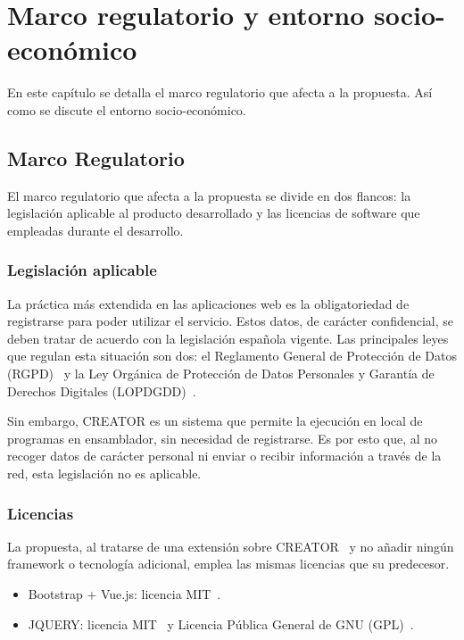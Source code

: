 \chapter{Marco regulatorio y entorno socio-económico}\label{chap:regulation}
En este capítulo se detalla el marco regulatorio que afecta a la propuesta. Así como se discute el entorno socio-económico.

\section{Marco Regulatorio}\label{sec:regulatory-framework}
El marco regulatorio que afecta a la propuesta se divide en dos flancos: la legislación aplicable al producto desarrollado y las licencias de software que empleadas durante el desarrollo.

\subsection{Legislación aplicable}
La práctica más extendida en las aplicaciones web es la obligatoriedad de registrarse para poder utilizar el servicio. Estos datos, de carácter confidencial, se deben tratar de acuerdo con la legislación española vigente. Las principales leyes que regulan esta situación son dos: el Reglamento General de Protección de Datos (RGPD)~\cite{rgpd} y la Ley Orgánica de Protección de Datos Personales y Garantía de Derechos Digitales (LOPDGDD)~\cite{ley-de-datos}.

Sin embargo, CREATOR es un sistema que permite la ejecución en local de programas en ensamblador, sin necesidad de registrarse. Es por esto que, al no recoger datos de carácter personal ni enviar o recibir información a través de la red, esta legislación no es aplicable.

\subsection{Licencias}
La propuesta, al tratarse de una extensión sobre CREATOR~\cite{camarmas2024creator} y no añadir ningún framework o tecnología adicional, emplea las mismas licencias que su predecesor.

\begin{itemize}
    \item Bootstrap + Vue.js: licencia MIT~\cite{MIT-license}.
    \item JQUERY: licencia MIT~\cite{MIT-license} y Licencia Pública General de GNU (GPL)~\cite{gnu-license}.
\end{itemize}

